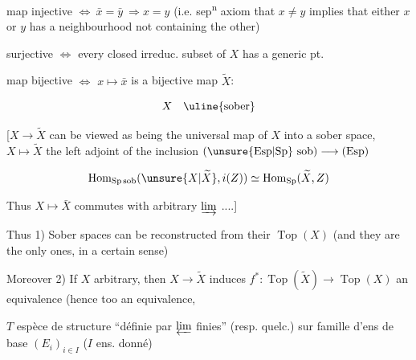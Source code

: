 
map injective $\Longleftrightarrow\ \bar x=\bar y\ \Rightarrow x=y$ (i.e. sep\textsuperscript{n} axiom that $x\ne y$ implies
that either $x$ or $y$ has a neighbourhood not containing the other)

 surjective $\Longleftrightarrow$ every closed irreduc. subset of $X$ has a generic pt.

 map bijective $\Longleftrightarrow$ $x\mapsto\bar x$ is a bijective map  $\widetilde X$:

\[
X\quad\text{\uline{sober}}
\]

[$X\longrightarrow\widetilde X$ can be viewed as being the universal map of $X$
into a sober space, $X\longmapsto\widetilde X$ the left adjoint of
the inclusion $(\unsure{\mathrm{Esp}|\mathrm{Sp}}\ \mathrm{sob})\longrightarrow(\mathrm{Esp})$

\[
\operatorname{Hom}_{\mathrm{Sp\,sob}}(\unsure{X|\widetilde X},i(Z))\simeq\operatorname{Hom}_{\mathrm{Sp}}(\widetilde X,Z)
\]

Thus $X\mapsto\bar X$ commutes with arbitrary $\varinjlim$ ....]


Thus 1) Sober spaces can be reconstructed from their $\operatorname{Top}(X)$
(and they are the only ones, in a certain sense)

Moreover 2) If $X$ arbitrary, then $X\to\widetilde X$ induces $f^*:\operatorname{Top}(\widetilde X)\to\operatorname{Top}(X)$
an equivalence (hence too an equivalence,

$T$ espèce de structure ``définie par $\varprojlim$ finies'' (resp. quelc.)
sur famille d'ens de base $(E_i)_{i\in I}$ ($I$ ens. donné)

